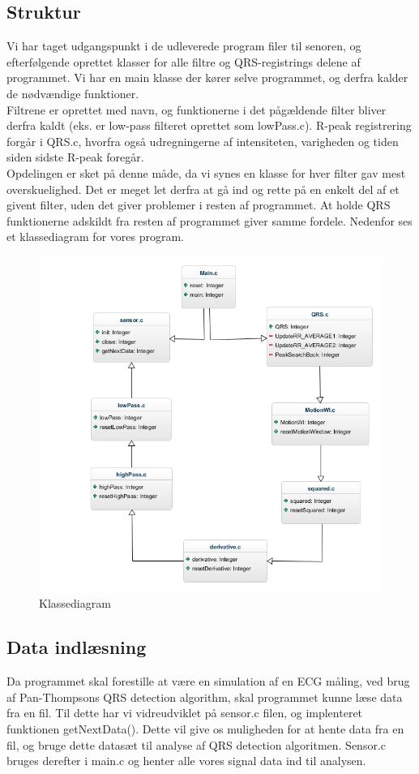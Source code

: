 \documentclass[a4paper,12pt]{article}
\begin{document}
\subsection*{Struktur}
Vi har taget udgangspunkt i de udleverede program filer til senoren, og efterfølgende oprettet klasser for alle filtre og QRS-registrings delene af programmet. Vi har en main klasse der kører selve programmet, og derfra kalder de nødvændige funktioner.\\
Filtrene er oprettet med navn, og funktionerne i det pågældende filter bliver derfra kaldt (eks. er low-pass filteret oprettet som lowPass.c). R-peak registrering forgår i QRS.c, hvorfra også udregningerne af intensiteten, varigheden og tiden siden sidste R-peak foregår.\\
Opdelingen er sket på denne måde, da vi synes en klasse for hver filter gav mest overskuelighed. Det er meget let derfra at gå ind og rette på en enkelt del af et givent filter, uden det giver problemer i resten af programmet. At holde QRS funktionerne adskildt fra resten af programmet giver samme fordele. Nedenfor ses et klassediagram for vores program.
\begin{figure}[htpb]
\centering
\includegraphics[scale=0.4]{fisse.jpg}
\caption{Klassediagram}
\label{Figur 2. Klassediagram}
\end{figure}
\newpage
\subsection{Data indlæsning}
Da programmet skal forestille at være en simulation af en ECG måling, ved brug af Pan-Thompsons QRS detection algorithm, skal programmet kunne læse data fra en fil. Til dette har vi vidreudviklet på sensor.c filen, og implenteret funktionen getNextData(). Dette vil give os muligheden for at hente data fra en fil, og bruge dette datasæt til analyse af QRS detection algoritmen. Sensor.c bruges derefter i main.c og henter alle vores signal data ind til analysen.
\end{document}
